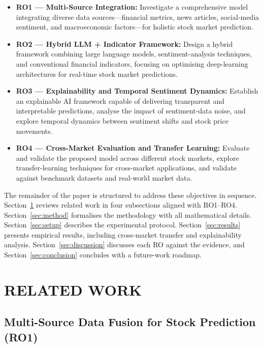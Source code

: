 \begin{itemize}
  \item \textbf{RO1 --- Multi-Source Integration:} Investigate a comprehensive
        model integrating diverse data sources---financial metrics, news articles,
        social-media sentiment, and macroeconomic factors---for holistic stock
        market prediction.
  \item \textbf{RO2 --- Hybrid LLM + Indicator Framework:} Design a hybrid
        framework combining large language models, sentiment-analysis techniques,
        and conventional financial indicators, focusing on optimising deep-learning
        architectures for real-time stock market predictions.
  \item \textbf{RO3 --- Explainability and Temporal Sentiment Dynamics:}
        Establish an explainable AI framework capable of delivering transparent
        and interpretable predictions, analyse the impact of sentiment-data noise,
        and explore temporal dynamics between sentiment shifts and stock price
        movements.
  \item \textbf{RO4 --- Cross-Market Evaluation and Transfer Learning:}
        Evaluate and validate the proposed model across different stock markets,
        explore transfer-learning techniques for cross-market applications, and
        validate against benchmark datasets and real-world market data.
\end{itemize}

The remainder of the paper is structured to address these objectives in sequence.
Section~\ref{sec:related} reviews related work in four subsections aligned
with RO1--RO4. Section~\ref{sec:method} formalises the methodology with all
mathematical details. Section~\ref{sec:setup} describes the experimental protocol.
Section~\ref{sec:results} presents empirical results, including cross-market
transfer and explainability analysis. Section~\ref{sec:discussion} discusses
each RO against the evidence, and Section~\ref{sec:conclusion} concludes with
a future-work roadmap.


\section{RELATED WORK}
\label{sec:related}

\subsection{Multi-Source Data Fusion for Stock Prediction (RO1)}

